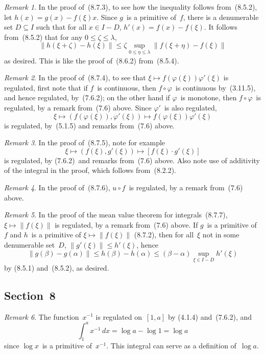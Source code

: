 \documentclass[letterpaper,12pt]{article}
\newcommand{\after}{\circ}
\newcommand{\inv}[1]{#1^{-1}}
\newcommand{\norm}[1]{\lVert{#1}\rVert}
\newcommand{\cbprod}[2]{[{#1}\cdot{#2}]}
\renewcommand{\d}[1]{\,d\!{#1}}
\newcommand{\dx}{\d{x}}
\theoremstyle{plain}
\theoremstyle{definition}
\theoremstyle{remark}
\newtheorem*{rmk}{Remark}
\begin{document}
\begin{rmk}
In the proof of~(8.7.3), to see how the inequality follows from~(8.5.2), let \(h(x)=g(x)-f(\xi)x\). Since \(g\)~is a primitive of~\(f\), there is a denumerable set \(D\subseteq I\) such that for all \(x\in I-D\), \(h'(x)=f(x)-f(\xi)\). It follows from~(8.5.2) that for any \(0\le\zeta\le\lambda\),
\[\norm{h(\xi+\zeta)-h(\xi)}\le\zeta\sup_{0\le\eta\le\lambda}\norm{f(\xi+\eta)-f(\xi)}\]
as desired. This is like the proof of~(8.6.2) from~(8.5.4).
\end{rmk}

\begin{rmk}
In the proof of~(8.7.4), to see that \(\xi\mapsto f(\varphi(\xi))\varphi'(\xi)\) is regulated, first note that if \(f\)~is continuous, then \(f\after\varphi\)~is continuous by~(3.11.5), and hence regulated, by~(7.6.2); on the other hand if \(\varphi\)~is monotone, then \(f\after\varphi\)~is regulated, by a remark from~(7.6) above. Since \(\varphi'\)~is also regulated,
\[\xi\mapsto(f(\varphi(\xi)),\varphi'(\xi))\mapsto f(\varphi(\xi))\varphi'(\xi)\]
is regulated, by~(5.1.5) and remarks from~(7.6) above.
\end{rmk}

\begin{rmk}
In the proof of~(8.7.5), note for example
\[\xi\mapsto(f(\xi),g'(\xi))\mapsto\cbprod{f(\xi)}{g'(\xi)}\]
is regulated, by (7.6.2)~and remarks from~(7.6) above. Also note use of additivity of the integral in the proof, which follows from~(8.2.2).
\end{rmk}

\begin{rmk}
In the proof of~(8.7.6), \(u\after f\)~is regulated, by a remark from~(7.6) above.
\end{rmk}

\begin{rmk}
In the proof of the mean value theorem for integrals~(8.7.7), \(\xi\mapsto\norm{f(\xi)}\) is regulated, by a remark from~(7.6) above. If \(g\)~is a primitive of~\(f\) and \(h\)~is a primitive of \(\xi\mapsto\norm{f(\xi)}\) (8.7.2), then for all~\(\xi\) not in some denumerable set~\(D\), \(\norm{g'(\xi)}\le h'(\xi)\), hence
\[\norm{g(\beta)-g(\alpha)}\le h(\beta)-h(\alpha)\le(\beta-\alpha)\sup_{\xi\in I-D} h'(\xi)\]
by (8.5.1) and~(8.5.2), as desired.
\end{rmk}

\subsection*{Section~8}
\begin{rmk}
The function~\(\inv{x}\) is regulated on~\([1,a]\) by (4.1.4) and~(7.6.2), and
\[\int_1^a\inv{x}\dx=\log a-\log 1=\log a\]
since \(\log x\)~is a primitive of~\(\inv{x}\). This integral can serve as a definition of~\(\log a\).
\end{rmk}
\end{document}
